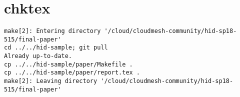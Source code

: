 \appendix
\section{chktex}
\begin{tiny}
\begin{verbatim}
make[2]: Entering directory '/cloud/cloudmesh-community/hid-sp18-515/final-paper'
cd ../../hid-sample; git pull
Already up-to-date.
cp ../../hid-sample/paper/Makefile .
cp ../../hid-sample/paper/report.tex .
make[2]: Leaving directory '/cloud/cloudmesh-community/hid-sp18-515/final-paper'
\end{verbatim}
\end{tiny}
